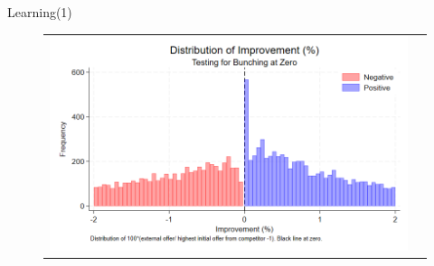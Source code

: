 \documentclass[10pt,aspectratio=169]{beamer}
\begin{document}
\begin{frame}%

\end{frame}

\begin{frame}{Learning(1)}
  \begin{figure}[H]
\caption{}
\label{fig:ie7_3}
\centering{}%
\begin{tabular}{cc}
\includegraphics[scale=0.39]{../figures/IE7/IE7_hist_bunching_max(2).png} 
\end{tabular}
\end{figure}
\end{frame}


 
\end{document}
